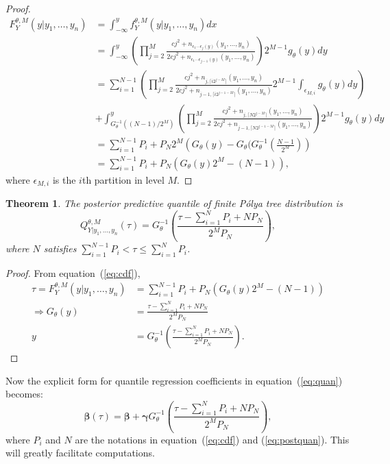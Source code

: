 \documentclass[12pt]{article}
\newtheorem{thm}{Theorem}[section]
\newcommand{\polya}{P\'{o}lya}
\begin{document}
\begin{proof}
  \begin{align*}
    F^{\theta,M}_Y(y| y_1, \ldots, y_n) & = \int_{-\infty}^y
    f_Y^{\theta,M} (y|y_1, \ldots, y_n) dx \\
    & = \int_{-\infty}^y \left( \prod_{j=2}^M \frac{cj^2 +
        n_{\epsilon_1 \cdots \epsilon_j(y) }(y_1, \ldots, y_n)}{2cj^2
        + n_{\epsilon_1 \cdots \epsilon_{j-1}(y)}(y_1, \ldots, y_n)}
    \right)2^{M-1} g_\theta(y) dy \\
    & = \sum_{i=1}^{N-1} \left( \prod_{j=2}^M \frac{cj^2 + n_{j,
          \lceil i2^{j-M} \rceil}(y_1, \ldots, y_n)}{2cj^2 + n_{j-1,
          \lceil i2^{j-1-M} \rceil}(y_1, \ldots, y_n)} 2^{M-1}
      \int_{\epsilon_{M,i}} g_{\theta}(y) dy \right) \\
    &+ \int_{G^{-1}_{\theta}((N-1)/2^M)}^y \left( \prod_{j=2}^M
      \frac{cj^2 + n_{j, \lceil N2^{j-M} \rceil}(y_1, \ldots,
        y_n)}{2cj^2 + n_{j-1, \lceil N2^{j-1-M} \rceil}(y_1, \ldots,
        y_n)}\right) 2^{M-1}
    g_{\theta}(y) dy \\
    & = \sum_{i=1}^{N-1} P_i + P_N 2^M \left( G_{\theta}(y) -
      G_{\theta}(G_{\theta}^{-1}\left( \frac{N-1}{2^M} \right)\right)\\
    & = \sum_{i=1}^{N-1}P_i + P_N \left( G_{\theta}(y) 2^M - (N-1)
    \right),
  \end{align*}
  where $\epsilon_{M,i}$ is the $i$th partition in level $M$.
\end{proof}

\begin{thm}
  The posterior predictive quantile of finite \polya{} tree
  distribution is
  \begin{equation}
    \label{eq:postquan}
    Q^{\theta, M}_{Y|y_1, \ldots, y_n}(\tau) = G^{-1}_{\theta} \left(
      \frac{\tau- \sum_{i=1}^N P_i + N P_N}{2^M P_N} \right),
  \end{equation}
  where $N$ satisfies $ \sum_{i=1}^{N-1} P_i < \tau \le \sum_{i=1}^N
  P_i$.
\end{thm}

\begin{proof}
  From equation~(\ref{eq:cdf}),
  \begin{align*}
    \tau = F^{\theta,M}_Y(y|y_1, \ldots, y_n) &= \sum_{i=1}^{N-1}
    P_{i} + P_N
    \left( G_{\theta}(y)2^M -(N-1) \right) \\
    \Rightarrow G_{\theta}(y) &= \frac{\tau - \sum_{i=1}^NP_i +
      NP_N}{2^MP_N} \\
    y & = G_{\theta}^{-1} \left(\frac{\tau - \sum_{i=1}^NP_i +
        NP_N}{2^MP_N} \right).
  \end{align*}
\end{proof}
Now the explicit form for quantile regression coefficients in equation~(\ref{eq:quan}) becomes:
\begin{equation}
  \label{eq:newquan}
  \bm{\beta}(\tau) = \bm{\beta} + \bm{\gamma}G_{\theta}^{-1}
  \left(\frac{\tau - \sum_{i=1}^NP_i +
      NP_N}{2^MP_N}  \right),
\end{equation}
where $P_i$ and $N$ are the notations in equation~(\ref{eq:cdf}) and
(\ref{eq:postquan}). This will greatly facilitate computations.
\end{document}
